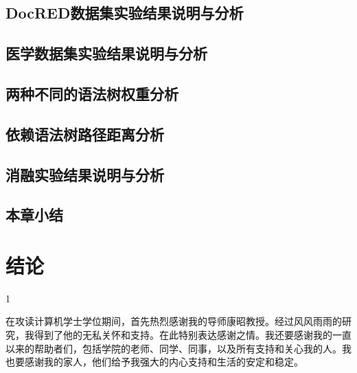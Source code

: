 \documentclass[bachelor]{thesis-uestc}
\begin{document}
\section{DocRED数据集实验结果说明与分析}\label{sec:docred}

\section{医学数据集实验结果说明与分析}\label{sec:medical}

\section{两种不同的语法树权重分析}\label{sec:weight}

\section{依赖语法树路径距离分析}\label{sec:distance}

\section{消融实验结果说明与分析}\label{sec:inter}

\section{本章小结}\label{sec:conclusion}
\newpage
\chapter{结论}
1

\thesisacknowledgement
在攻读计算机学士学位期间，首先热烈感谢我的导师康昭教授。经过风风雨雨的研究，我得到了他的无私关怀和支持。在此特别表达感谢之情。我还要感谢我的一直以来的帮助者们，包括学院的老师、同学、同事，以及所有支持和关心我的人。我也要感谢我的家人，他们给予我强大的内心支持和生活的安定和稳定。

%

%
%






\end{document}
